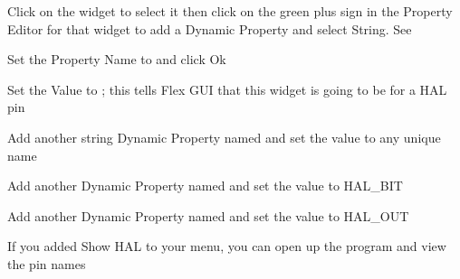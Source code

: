 \documentclass[letterpaper,10pt,english]{sphinxmanual}
\begin{document}
\sphinxAtStartPar
Click on the widget to select it then click on the green plus sign in the
Property Editor for that widget to add a Dynamic Property and select String.
See {\hyperref[\detokenize{property::doc}]{}}


\sphinxAtStartPar
Set the Property Name to  and click Ok


\sphinxAtStartPar
Set the Value to ; this tells Flex GUI that this widget is going to be
for a HAL pin


\sphinxAtStartPar
Add another string Dynamic Property named  and set the value to any
unique name


\sphinxAtStartPar
Add another Dynamic Property named  and set the value to HAL\_BIT


\sphinxAtStartPar
Add another Dynamic Property named  and set the value to HAL\_OUT


\sphinxAtStartPar
If you added Show HAL to your menu, you can open up the  program and
view the pin names

\end{document}

